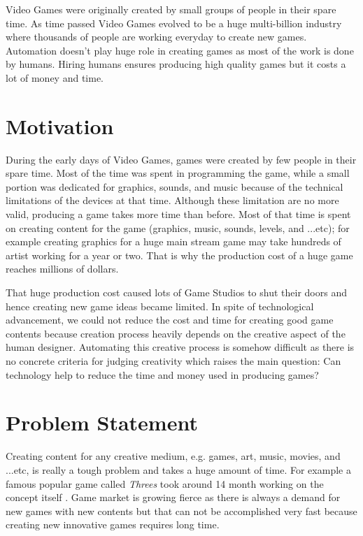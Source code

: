 Video Games were originally created by small groups of people in their spare time. As time passed Video Games evolved to be a huge multi-billion industry where thousands of people are working everyday to create new games. Automation doesn't play huge role in creating games as most of the work is done by humans. Hiring humans ensures producing high quality games but it costs a lot of money and time.

\section{Motivation}
During the early days of Video Games, games were created by few people in their spare time. Most of the time was spent in programming the game, while a small portion was dedicated for graphics, sounds, and music because of the technical limitations of the devices at that time. Although these limitation are no more valid, producing a game takes more time than before. Most of that time is spent on creating content for the game (graphics, music, sounds, levels, and ...etc)\cite{budgetAAA}; for example creating graphics for a huge main stream game may take hundreds of artist working for a year or two. That is why the production cost of a huge game reaches millions of dollars\cite{gameCost}.\\\par

That huge production cost caused lots of Game Studios to shut their doors \cite{gameCloses} and hence creating new game ideas became limited. In spite of technological advancement, we could not reduce the cost and time for creating good game contents because creation process heavily depends on the creative aspect of the human designer. Automating this creative process is somehow difficult as there is no concrete criteria for judging creativity which raises the main question: Can technology help to reduce the time and money used in producing games?

\section{Problem Statement}
Creating content for any creative medium, e.g. games, art, music, movies, and ...etc, is really a tough problem and takes a huge amount of time. For example a famous popular game called \emph{Threes} took around 14 month working on the concept itself \cite{threesTime}. Game market is growing fierce as there is always a demand for new games with new contents but that can not be accomplished very fast because creating new innovative games requires long time.\\\par

